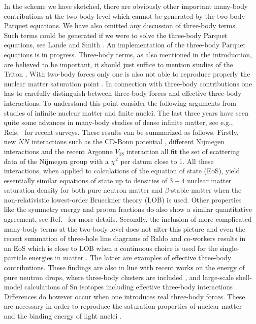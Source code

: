 In the scheme we have sketched, there are obviously other important
many-body contributions at the two-body level
which cannot be generated by the two-body Parquet equations.
We have also omitted any discussion of three-body terms.
Such terms could be generated if
we were to solve the three-body Parquet equations, see Lande and
Smith \cite{jls82}.
An implementation of the three-body Parquet equations is in progress.
Three-body terms, as also mentioned in the introduction, are believed
to be important, it should just  suffice
to mention studies of the Triton \cite{nogga97}.
With two-body forces only one is also not able
to reproduce properly the nuclear matter saturation point
\cite{apr98}. 
In connection with three-body contributions one has to carefully
distinguish between three-body forces and effective three-body
interactions. To understand this point consider the following arguments
from studies of infinite nuclear matter and finite nuclei.
The last three years have seen quite some advances in 
many-body studies of dense infinite matter, see e.g., Refs.\ 
\cite{apr98,engvik97,baldo98} for recent surveys. 
These results can be summarized as follows. 
Firstly, new $NN$  interactions such as
the CD-Bonn potential \cite{cdbonn}, different Nijmegen interactions
\cite{nijmegen94} and the recent Argonne $V_{18}$ interaction
\cite{argv18}
all fit 
the set of scattering data of the 
Nijmegen group 
with a $\chi^2$ per datum close to 1. All these interactions,
when applied to calculations of the equation of state (EoS),
yield essentially similar equations of state up to
densities of $3-4$ nuclear matter saturation density  
for both pure neutron matter
and $\beta$-stable matter when 
the non-relativistic lowest-order Brueckner theory (LOB) is used. 
Other properties like the 
symmetry energy and proton fractions do also show
a similar quantitative agreement, see Ref.\ \cite{engvik97} for more
details.
Secondly, the inclusion of more complicated 
many-body terms at the two-body \cite{apr98}
level does not alter this picture and even the recent 
summation of three-hole line diagrams of Baldo and co-workers
\cite{baldo98} results in an EoS which is  
close to LOB when a continuous
choice is used for the single-particle energies in matter
\cite{baldo98}. The latter are examples of effective
three-body contributions. These findings 
are also in line with
recent works on the energy of pure neutron 
drops, where three-body clusters are included \cite{ndrops97},
and large-scale shell-model calculations of Sn 
isotopes including 
effective three-body interactions \cite{eho99}.
Differences do however occur 
when one introduces real three-body forces.
These are necessary
in order to reproduce the saturation properties of nuclear matter
\cite{apr98} and the binding energy of light nuclei \cite{vijay}.


